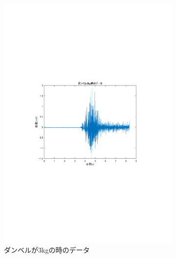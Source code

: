 \documentclass[dvipdfmx, titlepage, t]{jsarticle}
\begin{document}
\begin{figure}[H]
    \begin{subfigure}[b]{0.48\linewidth}
        \centering
        \includegraphics[trim=90 250 100 250 clip,width=\linewidth]{figure/data_3kg.pdf}
        \caption{ダンベルが3kgの時のデータ} %
    \end{subfigure}
    \hfill
    \begin{subfigure}[b]{0.48\linewidth}
        \centering

\end{subfigure}
\end{figure}
\end{document}
